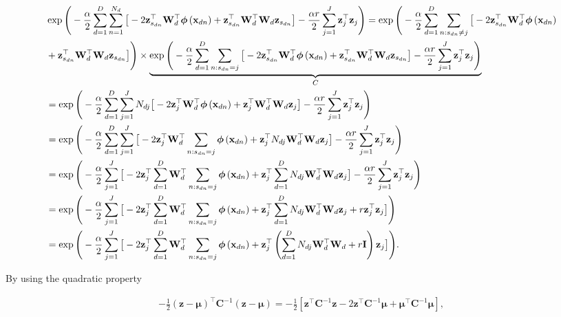 	\begin{align}
	&\exp\Bigg(-\frac{\alpha}{2} \sum_{d=1}^{D}\sum_{n=1}^{N_d}\big[ -2 \mathbf{z}_{s_{dn}} ^\top \mathbf{W}_d^\top \boldsymbol{\phi}\left(\mathbf{x}_{dn}\right)+\mathbf{z}_{s_{dn}}^\top \mathbf{W}_d^\top \mathbf{W}_d \mathbf{z}_{s_{dn}} \big] -\frac{\alpha r}{2} \sum_{j=1}^{J}\mathbf{z}_j^\top\mathbf{z}_j \Bigg) = \exp\Bigg(-\frac{\alpha}{2} \sum_{d=1}^{D}\sum_{n:s_{dn}\ne j}\big[  -2 \mathbf{z}_{s_{dn}} ^\top \mathbf{W}_d^\top \boldsymbol{\phi}\left(\mathbf{x}_{dn}\right)\notag\\
	&+ \mathbf{z}_{s_{dn}}^\top \mathbf{W}_d^\top \mathbf{W}_d \mathbf{z}_{s_{dn}} \big] \Bigg)\times \underbrace{\exp\Bigg(-\frac{\alpha}{2} \sum_{d=1}^{D}\sum_{n:s_{dn}=j}\big[ -2 \mathbf{z}_{s_{dn}} ^\top \mathbf{W}_d^\top \boldsymbol{\phi}\left(\mathbf{x}_{dn}\right)+\mathbf{z}_{s_{dn}}^\top \mathbf{W}_d^\top \mathbf{W}_d \mathbf{z}_{s_{dn}} \big]-\frac{\alpha r}{2} \sum_{j=1}^{J}\mathbf{z}_j^\top\mathbf{z}_j\Bigg)}_{C} \notag\\
	&=\exp\Bigg(-\frac{\alpha}{2} \sum_{d=1}^{D}\sum_{j=1}^J N_{dj}\big[ -2 \mathbf{z}_j ^\top \mathbf{W}_d^\top \boldsymbol{\phi}\left(\mathbf{x}_{dn}\right)+\mathbf{z}_j^\top \mathbf{W}_d^\top \mathbf{W}_d \mathbf{z}_j \big]-\frac{\alpha r}{2} \sum_{j=1}^{J}\mathbf{z}_j^\top\mathbf{z}_j\Bigg) \notag\\
	&=\exp\Bigg(-\frac{\alpha}{2} \sum_{d=1}^{D}\sum_{j=1}^J \big[ -2 \mathbf{z}_j ^\top \mathbf{W}_d^\top \sum_{n:s_{dn}=j}\boldsymbol{\phi}\left(\mathbf{x}_{dn}\right)+\mathbf{z}_j^\top N_{dj}\mathbf{W}_d^\top \mathbf{W}_d \mathbf{z}_j \big]-\frac{\alpha r}{2} \sum_{j=1}^{J}\mathbf{z}_j^\top\mathbf{z}_j\Bigg) \notag \\
	&=\exp\Bigg(-\frac{\alpha}{2}\sum_{j=1}^J \big[ -2 \mathbf{z}_j ^\top  \sum_{d=1}^{D}\mathbf{W}_d^\top \sum_{n:s_{dn}=j}\boldsymbol{\phi}\left(\mathbf{x}_{dn}\right)+\mathbf{z}_j^\top  \sum_{d=1}^{D} N_{dj}\mathbf{W}_d^\top \mathbf{W}_d \mathbf{z}_j \big]-\frac{\alpha r}{2} \sum_{j=1}^{J}\mathbf{z}_j^\top\mathbf{z}_j\Bigg) \notag \\
	&= \exp\Bigg(-\frac{\alpha}{2}\sum_{j=1}^J \big[ -2 \mathbf{z}_j ^\top  \sum_{d=1}^{D}\mathbf{W}_d^\top \sum_{n:s_{dn}=j}\boldsymbol{\phi}\left(\mathbf{x}_{dn}\right)+\mathbf{z}_j^\top  \sum_{d=1}^{D} N_{dj}\mathbf{W}_d^\top \mathbf{W}_d \mathbf{z}_j + r\mathbf{z}_j^\top\mathbf{z}_j\big]\Bigg) \notag \\
	&= \exp\Bigg(-\frac{\alpha}{2}\sum_{j=1}^J \big[ -2 \mathbf{z}_j ^\top  \sum_{d=1}^{D}\mathbf{W}_d^\top \sum_{n:s_{dn}=j}\boldsymbol{\phi}\left(\mathbf{x}_{dn}\right)+\mathbf{z}_j^\top  \left(\sum_{d=1}^{D} N_{dj}\mathbf{W}_d^\top \mathbf{W}_d + r\mathbf{I}\right) \mathbf{z}_j \big]\Bigg).
	\label{eq:llExp1linf}
	\end{align}
	
	By using the quadratic property
	
	\begin{align}
	-\frac{1}{2}\left(\mathbf{z}-\boldsymbol{\mu}\right)^\top \boldsymbol{C}^{-1} \left(\mathbf{z}-\boldsymbol{\mu}\right) = -\frac{1}{2}\left[\mathbf{z}^\top \boldsymbol{C}^{-1}\mathbf{z} -2\mathbf{z}^\top \boldsymbol{C}^{-1}\boldsymbol{\mu} + \boldsymbol{\mu}^\top\boldsymbol{C}^{-1}\boldsymbol{\mu}\right] \label{eq:quadlinf},
	\end{align}
	
